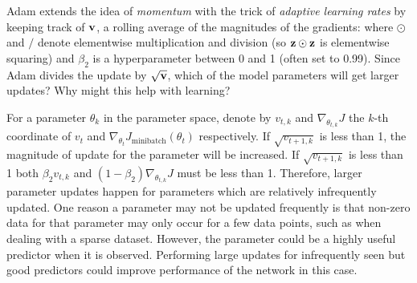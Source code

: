 \begin{parts}
\begin{subparts}
            \subpart[2] Adam extends the idea of {\it momentum} with the trick of {\it adaptive learning rates} by keeping track of  $\mathbf{v}$, a rolling average of the magnitudes of the gradients:
                where $\odot$ and $/$ denote elementwise multiplication and division (so $\mathbf{z} \odot \mathbf{z}$ is elementwise squaring) and $\beta_2$ is a hyperparameter between 0 and 1 (often set to  0.99). Since Adam divides the update by $\sqrt{\mathbf{v}}$, which of the model parameters will get larger updates?  Why might this help with learning?
               \begin{shaded}
                \begin{answer}
                    For a parameter $\theta_k$ in the parameter space, denote by $v_{t,k}$ and $\nabla_{\theta_{t,k}}J$
                    the $k$-th coordinate of $v_t$ and $\nabla_{\theta_t}J_{\text{minibatch}}(\theta_t)$ respectively. If $\sqrt{v_{t+1,k}}$ is less than 1,
                     the magnitude of update for the parameter will be increased. If $\sqrt{v_{t+1,k}}$ is less than 1 both $\beta_2 v_{t,k}$ and $(1-\beta_2)\nabla_{\theta_{t,k}}J$ 
                     must be less than 1. Therefore, larger parameter updates happen for parameters which are relatively infrequently updated.
                    One reason a parameter may not be updated frequently is that non-zero data for that parameter may only occur for a few data points,
                    such as when dealing with a sparse dataset. However, the parameter could be a highly useful predictor when it is observed.
                    Performing large updates for infrequently seen but good predictors could improve performance of the network in this case. 
                \end{answer}
               \end{shaded}
           
                
                \end{subparts}
        
        

\end{parts}
